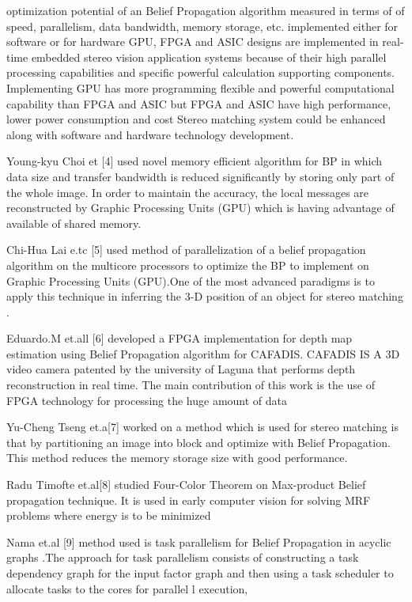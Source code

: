 optimization potential of an Belief Propagation algorithm measured  in terms of
of speed, parallelism, data bandwidth, memory storage, etc. implemented either for  software or  for hardware
 GPU, FPGA and ASIC designs are  implemented in real-time embedded stereo vision application systems because of their high parallel processing capabilities and specific powerful calculation supporting components.
Implementing GPU has more programming flexible and powerful computational capability than FPGA and ASIC but FPGA and ASIC  have high performance, lower power consumption and cost
Stereo matching system could be enhanced along with software and hardware technology development.


Young-kyu Choi et [4] used novel memory efficient algorithm for BP in which data size and transfer bandwidth is reduced significantly by storing only part of the whole image.
In order to maintain the accuracy, the local messages are reconstructed by Graphic Processing Units (GPU) which is having advantage of available of shared memory.



Chi-Hua Lai e.tc [5] used  method of  parallelization of a belief propagation algorithm on the multicore processors  to optimize the BP  to implement on Graphic Processing Units (GPU).One of the most advanced paradigms is to apply this  technique in inferring the 3-D position of an object for stereo matching .


 Eduardo.M et.all [6] developed a FPGA implementation for depth map estimation using Belief Propagation algorithm for CAFADIS. CAFADIS IS A 3D video camera  patented  by the university of Laguna that performs depth reconstruction in real time.
The main contribution of this work is the use of FPGA technology for processing the huge amount of data



Yu-Cheng Tseng et.a[7]  worked on  a method which is  used  for stereo matching is that by partitioning an image into block and optimize with Belief Propagation. This method reduces the memory storage size with good performance.





Radu  Timofte et.al[8] studied Four-Color Theorem  on Max-product Belief propagation technique. It is used in early computer vision for solving MRF problems where energy is to be minimized

Nama et.al [9]  method used is task parallelism for Belief Propagation in acyclic graphs .The approach for task parallelism consists of constructing a task dependency graph for the input factor graph and then using a task scheduler to allocate tasks to the cores for parallel l execution,






